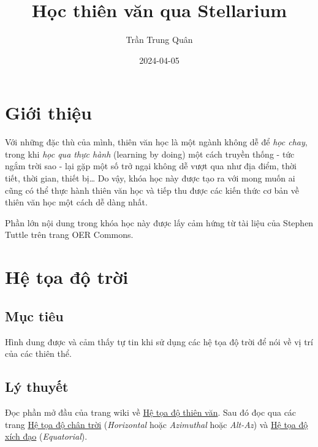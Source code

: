 \documentclass[
]{book}
\title{Học thiên văn qua Stellarium}
\author{Trần Trung Quân}
\date{2024-04-05}
\begin{document}
\maketitle

{
\setcounter{tocdepth}{1}
\tableofcontents
}
\chapter*{Giới thiệu}\label{giux1edbi-thiux1ec7u}

Với những đặc thù của mình, thiên văn học là một ngành không dễ để \emph{học chay}, trong khi \emph{học qua thực hành} (learning by doing) một cách truyền thống - tức ngắm trời sao - lại gặp một số trở ngại không dễ vượt qua như địa điểm, thời tiết, thời gian, thiết bị\ldots{} Do vậy, khóa học này được tạo ra với mong muốn ai cũng có thể thực hành thiên văn học và tiếp thu được các kiến thức cơ bản về thiên văn học một cách dễ dàng nhất.

Phần lớn nội dung trong khóa học này được lấy cảm hứng từ tài liệu của Stephen Tuttle \citep{stuttle} trên trang OER Commons.

\chapter{Hệ tọa độ trời}\label{hux1ec7-tux1ecda-ux111ux1ed9-trux1eddi}

\section{Mục tiêu}\label{mux1ee5c-tiuxeau}

Hình dung được và cảm thấy tự tin khi sử dụng các hệ tọa độ trời để nói về vị trí của các thiên thể.

\section{Lý thuyết}\label{luxfd-thuyux1ebft}

Đọc phần mở đầu của trang wiki về
\href{https://vi.wikipedia.org/wiki/H\%E1\%BB\%87_t\%E1\%BB\%8Da_\%C4\%91\%E1\%BB\%99_thi\%C3\%AAn_v\%C4\%83n}{Hệ tọa độ thiên văn}.
Sau đó đọc qua các trang
\href{https://vi.wikipedia.org/wiki/H\%E1\%BB\%87_t\%E1\%BB\%8Da_\%C4\%91\%E1\%BB\%99_ch\%C3\%A2n_tr\%E1\%BB\%9Di}{Hệ tọa độ chân trời} (\emph{Horizontal} hoặc \emph{Azimuthal} hoặc \emph{Alt-Az})
và \href{https://vi.wikipedia.org/wiki/H\%E1\%BB\%87_t\%E1\%BB\%8Da_\%C4\%91\%E1\%BB\%99_x\%C3\%ADch_\%C4\%91\%E1\%BA\%A1o}{Hệ tọa độ xích đạo} (\emph{Equatorial}).
\end{document}

